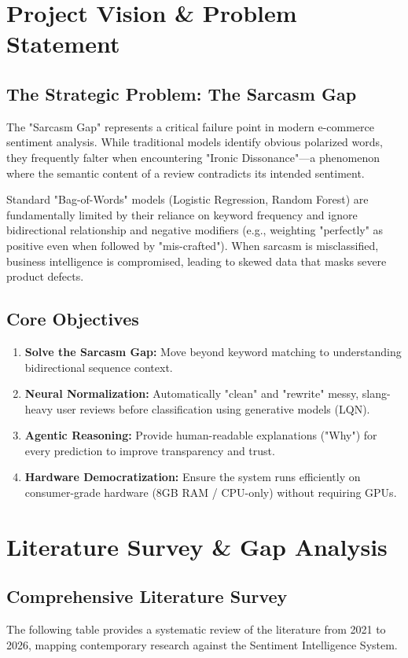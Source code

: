 \documentclass[11pt,oneside]{scrbook}
\begin{document}
\chapter{Project Vision \& Problem Statement}

\section{The Strategic Problem: The Sarcasm Gap}
The "Sarcasm Gap" represents a critical failure point in modern e-commerce sentiment analysis. While traditional models identify obvious polarized words, they frequently falter when encountering "Ironic Dissonance"---a phenomenon where the semantic content of a review contradicts its intended sentiment. 

Standard "Bag-of-Words" models (Logistic Regression, Random Forest) are fundamentally limited by their reliance on keyword frequency and ignore bidirectional relationship and negative modifiers (e.g., weighting "perfectly" as positive even when followed by "mis-crafted"). When sarcasm is misclassified, business intelligence is compromised, leading to skewed data that masks severe product defects.

\section{Core Objectives}
\begin{enumerate}
    \item \textbf{Solve the Sarcasm Gap:} Move beyond keyword matching to understanding bidirectional sequence context.
    \item \textbf{Neural Normalization:} Automatically "clean" and "rewrite" messy, slang-heavy user reviews before classification using generative models (LQN).
    \item \textbf{Agentic Reasoning:} Provide human-readable explanations ("Why") for every prediction to improve transparency and trust.
    \item \textbf{Hardware Democratization:} Ensure the system runs efficiently on consumer-grade hardware (8GB RAM / CPU-only) without requiring GPUs.
\end{enumerate}

\chapter{Literature Survey \& Gap Analysis}

\section{Comprehensive Literature Survey}
The following table provides a systematic review of the literature from 2021 to 2026, mapping contemporary research against the Sentiment Intelligence System.
\end{document}
